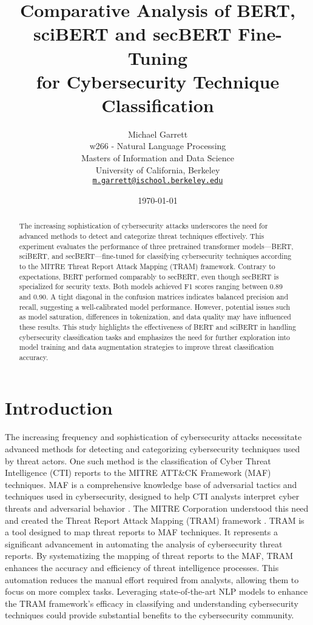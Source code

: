 \documentclass[11pt]{article}
\title{Comparative Analysis of BERT,\\sciBERT and secBERT Fine-Tuning\\for Cybersecurity Technique Classification}
\author{Michael Garrett \\
  w266 - Natural Language Processing \\
  Masters of Information and Data Science \\
  University of California, Berkeley \\
  \texttt{\href{mailto:m.garrett@ischool.berkeley.edu}{m.garrett@ischool.berkeley.edu}}}
\date{\today}
\begin{document}
\maketitle
\begin{abstract}
The increasing sophistication of cybersecurity attacks underscores the need for advanced methods to detect and categorize threat techniques effectively. This experiment evaluates the performance of three pretrained transformer models—BERT, sciBERT, and secBERT—fine-tuned for classifying cybersecurity techniques according to the MITRE Threat Report Attack Mapping (TRAM) framework. Contrary to expectations, BERT performed comparably to secBERT, even though secBERT is specialized for security texts. Both models achieved F1 scores ranging between 0.89 and 0.90. A tight diagonal in the confusion matrices indicates balanced precision and recall, suggesting a well-calibrated model performance. However, potential issues such as model saturation, differences in tokenization, and data quality may have influenced these results. This study highlights the effectiveness of BERT and sciBERT in handling cybersecurity classification tasks and emphasizes the need for further exploration into model training and data augmentation strategies to improve threat classification accuracy.
\end{abstract}


\section{Introduction}

The increasing frequency and sophistication of cybersecurity attacks necessitate advanced methods for detecting and categorizing cybersecurity techniques used by threat actors. One such method is the classification of Cyber Threat Intelligence (CTI) reports to the MITRE ATT\&CK Framework (MAF) techniques. MAF is a comprehensive knowledge base of adversarial tactics and techniques used in cybersecurity, designed to help CTI analysts interpret cyber threats and adversarial behavior \cite{hubbard2020measuring}. The MITRE Corporation understood this need and created the Threat Report Attack Mapping (TRAM) framework \cite{tram}. TRAM is a tool designed to map threat reports to MAF techniques. It represents a significant advancement in automating the analysis of cybersecurity threat reports. By systematizing the mapping of threat reports to the MAF, TRAM enhances the accuracy and efficiency of threat intelligence processes. This automation reduces the manual effort required from analysts, allowing them to focus on more complex tasks. Leveraging state-of-the-art NLP models to enhance the TRAM framework's efficacy in classifying and understanding cybersecurity techniques could provide substantial benefits to the cybersecurity community.
\end{document}
